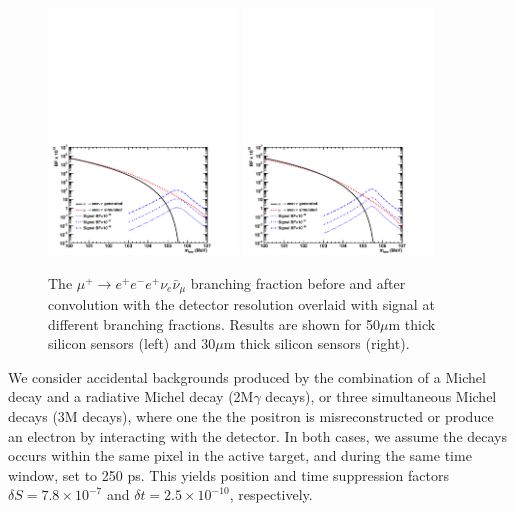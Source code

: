 \begin{figure}[htb]
\begin{center}
\includegraphics[width=0.45\textwidth]{Figures/mu3e-irr.pdf}
\includegraphics[width=0.45\textwidth]{Figures/mu3e-irr2.pdf}
\end{center}
\caption{The $\mu^+ \rightarrow e^+e^-e^+\nu_e \bar\nu_\mu$ branching fraction before and after convolution with the detector resolution overlaid with signal at different branching 
fractions. Results are shown for 50$\mu$m thick silicon sensors (left) and 30$\mu$m thick silicon sensors (right).}
\label{Fig::mu3e2}
\end{figure}


We consider accidental backgrounds produced by the combination of a Michel decay and a radiative Michel decay (2M$\gamma$ decays), or three simultaneous Michel decays (3M decays), where one the the positron is misreconstructed or produce an electron by interacting with the detector. In both cases, we assume 
the decays occurs within the same pixel in the active target, and during the same time window, set to 250 ps. This yields position and time suppression factors $\delta S = 7.8\times 10^{-7}$ and $\delta t = 2.5\times 10^{-10}$, respectively. 

